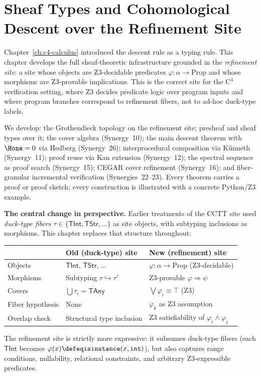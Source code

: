 
\chapter{Sheaf Types and Cohomological Descent over the Refinement Site}
\label{ch:c4-descent}

Chapter~\ref{ch:c4-calculus} introduced the descent rule as a typing rule.
This chapter develops the full sheaf-theoretic infrastructure grounded in
the \emph{refinement site}: a site whose objects are Z3-decidable predicates
$\varphi : \alpha \to \mathrm{Prop}$ and whose morphisms are Z3-provable
implications.  This is the correct site for the $\mathrm{C}^4$ verification
setting, where Z3 decides predicate logic over program inputs and where
program branches correspond to refinement fibers, not to ad-hoc duck-type
labels.

We develop: the Grothendieck topology on the refinement site; presheaf and
sheaf types over it; the cover algebra (Synergy~10); the main descent theorem
with $\Hone = 0$ via Hedberg (Synergy~26); interprocedural composition via
Künneth (Synergy~11); proof reuse via Kan extension (Synergy~12); the
spectral sequence as proof search (Synergy~15); CEGAR cover refinement
(Synergy~16); and fiber-granular incremental verification (Synergies~22--23).
Every theorem carries a proof or proof sketch; every construction is
illustrated with a concrete Python/Z3 example.

\bigskip
\noindent\textbf{The central change in perspective.}  Earlier treatments of
the CCTT site used \emph{duck-type fibers} $\tau \in \{\mathsf{TInt},
\mathsf{TStr}, \ldots\}$ as site objects, with subtyping inclusions as
morphisms.  This chapter replaces that structure throughout:
\begin{center}
\renewcommand{\arraystretch}{1.3}
\begin{tabular}{lll}
\toprule
& \textbf{Old (duck-type) site} & \textbf{New (refinement) site} \\
\midrule
Objects & $\mathsf{TInt}$, $\mathsf{TStr}$, \ldots &
  $\varphi : \alpha \to \mathrm{Prop}$ (Z3-decidable) \\
Morphisms & Subtyping $\tau \hookrightarrow \tau'$ &
  Z3-provable $\varphi \Rightarrow \psi$ \\
Covers & $\bigcup \tau_i = \mathsf{TAny}$ &
  $\bigvee \varphi_i \equiv \top$ (Z3) \\
Fiber hypothesis & None & $\varphi_k$ as Z3 assumption \\
Overlap check & Structural type inclusion & Z3 satisfiability of
  $\varphi_i \wedge \varphi_j$ \\
\bottomrule
\end{tabular}
\end{center}
The refinement site is strictly more expressive: it subsumes duck-type
fibers (each $\mathsf{TInt}$ becomes $\varphi(x) \defeq
\mathtt{isinstance}(x,\mathtt{int})$), but also captures range conditions,
nullability, relational constraints, and arbitrary Z3-expressible predicates.



